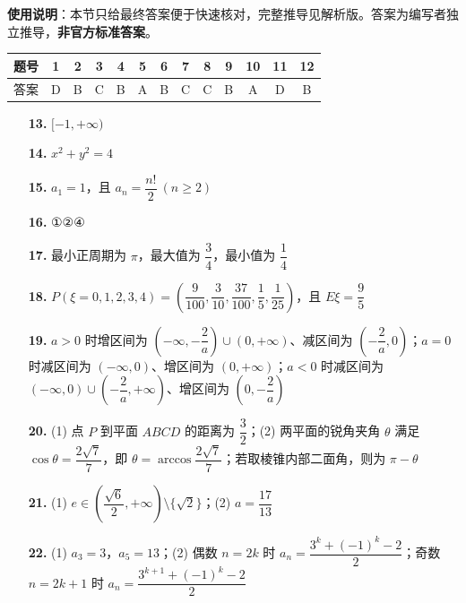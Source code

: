 
\begin{gknotice}
\textbf{使用说明}：本节只给最终答案便于快速核对，完整推导见解析版。答案为编写者独立推导，\textbf{非官方标准答案}。
\end{gknotice}

\begin{center}\begin{tabular}{ccccccccccccc}
\toprule
题号 & 1 & 2 & 3 & 4 & 5 & 6 & 7 & 8 & 9 & 10 & 11 & 12 \\
\midrule
答案 & D & B & C & B & A & B & C & C & B & A & D & B \\
\bottomrule
\end{tabular}\end{center}

\begin{itemize}[leftmargin=2.6em]
  \item[\textbf{13.}] $[-1,+\infty)$
  \item[\textbf{14.}] $x^2+y^2=4$
  \item[\textbf{15.}] $a_1=1$，且 $a_n=\dfrac{n!}{2}\ (n\geqslant2)$
  \item[\textbf{16.}] ①②④
\end{itemize}

\begin{itemize}[leftmargin=2.6em]
  \item[\textbf{17.}] 最小正周期为 $\pi$，最大值为 $\dfrac34$，最小值为 $\dfrac14$
  \item[\textbf{18.}] $P(\xi=0,1,2,3,4)=\left(\dfrac9{100},\dfrac3{10},\dfrac{37}{100},\dfrac15,\dfrac1{25}\right)$，且 $E\xi=\dfrac95$
  \item[\textbf{19.}] $a>0$ 时增区间为 $\left(-\infty,-\dfrac2a\right)\cup(0,+\infty)$、减区间为 $\left(-\dfrac2a,0\right)$；$a=0$ 时减区间为 $(-\infty,0)$、增区间为 $(0,+\infty)$；$a<0$ 时减区间为 $(-\infty,0)\cup\left(-\dfrac2a,+\infty\right)$、增区间为 $\left(0,-\dfrac2a\right)$
  \item[\textbf{20.}] (1) 点 $P$ 到平面 $ABCD$ 的距离为 $\dfrac32$；(2) 两平面的锐角夹角 $\theta$ 满足 $\cos\theta=\dfrac{2\sqrt7}{7}$，即 $\theta=\arccos\dfrac{2\sqrt7}{7}$；若取棱锥内部二面角，则为 $\pi-\theta$
  \item[\textbf{21.}] (1) $e\in\left(\dfrac{\sqrt6}{2},+\infty\right)\setminus\{\sqrt2\}$；(2) $a=\dfrac{17}{13}$
  \item[\textbf{22.}] (1) $a_3=3$，$a_5=13$；(2) 偶数 $n=2k$ 时 $a_n=\dfrac{3^k+(-1)^k-2}{2}$；奇数 $n=2k+1$ 时 $a_n=\dfrac{3^{k+1}+(-1)^k-2}{2}$
\end{itemize}
